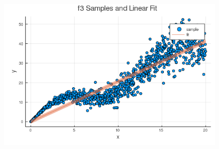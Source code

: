 \documentclass[12pt,letter]{article}
\begin{document}
\begin{enumerate}
\begin{figure}[h]
\end{figure}
\begin{figure}[h]
  \centering
  \includegraphics[width=12cm,keepaspectratio]{imgs/2_5_1_2_3.png}
\end{figure}
\end{enumerate}
\pagebreak
\end{document}
